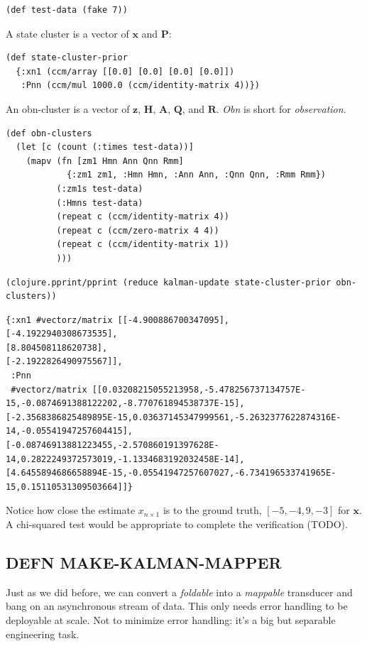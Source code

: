 \documentclass[10pt,oneside,x11names]{article}
\begin{document}
\begin{verbatim}
(def test-data (fake 7))
\end{verbatim}

A state cluster is a vector of \(\boldsymbol{x}\) and \(\boldsymbol{P}\):

\begin{verbatim}
(def state-cluster-prior
  {:xn1 (ccm/array [[0.0] [0.0] [0.0] [0.0]])
   :Pnn (ccm/mul 1000.0 (ccm/identity-matrix 4))})
\end{verbatim}

An obn-cluster is a vector of \(\boldsymbol{z}\), \(\boldsymbol{H}\),
\(\boldsymbol{A}\), \(\boldsymbol{Q}\), and \(\boldsymbol{R}\). \emph{Obn} is short
for \emph{observation}.

\begin{verbatim}
(def obn-clusters
  (let [c (count (:times test-data))]
    (mapv (fn [zm1 Hmn Ann Qnn Rmm]
            {:zm1 zm1, :Hmn Hmn, :Ann Ann, :Qnn Qnn, :Rmm Rmm})
          (:zm1s test-data)
          (:Hmns test-data)
          (repeat c (ccm/identity-matrix 4))
          (repeat c (ccm/zero-matrix 4 4))
          (repeat c (ccm/identity-matrix 1))
          )))
\end{verbatim}

\begin{verbatim}
(clojure.pprint/pprint (reduce kalman-update state-cluster-prior obn-clusters))
\end{verbatim}

\begin{verbatim}
{:xn1 #vectorz/matrix [[-4.900886700347095],
[-4.1922940308673535],
[8.804508118620738],
[-2.1922826490975567]],
 :Pnn
 #vectorz/matrix [[0.03208215055213958,-5.478256737134757E-15,-0.0874691388122202,-8.770761894538737E-15],
[-2.3568386825489895E-15,0.03637145347999561,-5.2632377622874316E-14,-0.05541947257604415],
[-0.08746913881223455,-2.570860191397628E-14,0.2822249372573019,-1.1334683192032458E-14],
[4.6455894686658894E-15,-0.05541947257607027,-6.734196533741965E-15,0.15110531309503664]]}
\end{verbatim}


Notice how close the estimate \(x_{n\times{1}}\) is to the ground truth, \([-5, -4,
9, -3]\) for \(\boldsymbol{x}\). A chi-squared test would be appropriate to
complete the verification (TODO).

\subsection{DEFN MAKE-KALMAN-MAPPER}
\label{make-kalman-mapper}
Just as we did before, we can convert a \emph{foldable} into a \emph{mappable}
transducer and bang on an asynchronous stream of data. This only needs
error handling to be deployable at scale. Not to minimize error
handling: it's a big but separable engineering task.
\end{document}
